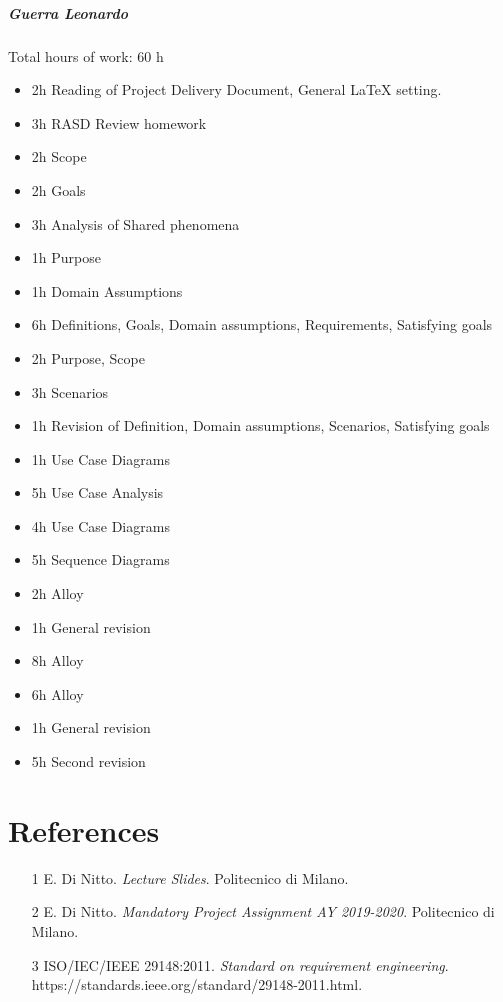 \documentclass{report}
\newcommand{\ic}[1]{\textit{#1}}
\begin{document}
		\paragraph{Guerra Leonardo} Total hours of work: 60 h
			\begin{itemize}
				\item 2h Reading of Project Delivery Document, General LaTeX setting.
				\item 3h RASD Review homework
				\item 2h Scope
				\item 2h Goals
				\item 3h Analysis of Shared phenomena
				\item 1h Purpose
				\item 1h Domain Assumptions
				\item 6h Definitions, Goals, Domain assumptions, Requirements, Satisfying goals
				\item 2h Purpose, Scope
				\item 3h Scenarios
				\item 1h Revision of Definition, Domain assumptions, Scenarios, Satisfying goals
				\item 1h Use Case Diagrams
				\item 5h Use Case Analysis
				\item 4h Use Case Diagrams
				\item 5h Sequence Diagrams
				\item 2h Alloy
				\item 1h General revision
				\item 8h Alloy
				\item 6h Alloy
				\item 1h General revision
				\item 5h Second revision
			\end{itemize}
	\chapter{References}
	\thispagestyle{fancy}
	\begin{itemize}
				\item[1]E. Di Nitto. \ic{Lecture Slides}. Politecnico di Milano.
				\item[2]E. Di Nitto. \ic{Mandatory Project Assignment AY 2019-2020}. Politecnico di Milano.
				\item[3]ISO/IEC/IEEE 29148:2011. \ic{Standard on requirement engineering}.\\https://standards.ieee.org/standard/29148-2011.html.
	\end{itemize}
	
\end{document}
